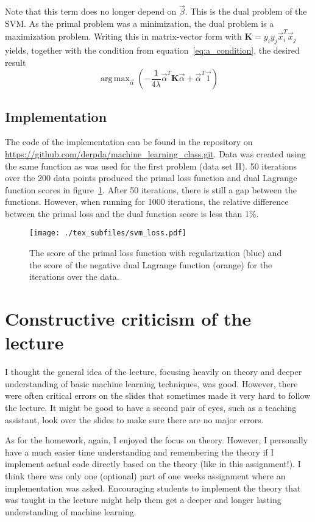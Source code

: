 \documentclass[a4paper]{article}
\DeclareMathOperator*{\argmax}{arg\,max}
\newcommand{\matr}[1]{\mathbf{#1}}
\begin{document}
Note that this term does no longer depend on $\vec{\beta}$. This is the dual
problem of the SVM\@. As the primal problem was a minimization, the dual problem
is a maximization problem. Writing this in matrix-vector form with
$\matr{K}=y_iy_j\vec{x}_i^T\vec{x}_j$ yields, together with the condition from
equation~\ref{eq:a_condition}, the desired result
\begin{equation*}
    \argmax_{\vec{\alpha}}\left(
        - \frac{1}{4\lambda}\vec{\alpha}^T\matr{K}\vec{\alpha}
        + \vec{\alpha}^T\vec{1}
    \right)
\end{equation*}
\subsection{Implementation}
The code of the implementation can be found in the repository on
\url{https://github.com/derpda/machine_learning_class.git}.
Data was created using the same function as was used for the first problem (data
set II). 50 iterations over the 200 data points produced the primal loss
function and dual Lagrange function scores in figure~\ref{fig:svm_loss}.
After 50 iterations, there is still a gap between the functions. However, when
running for 1000 iterations, the relative difference between the primal loss and
the dual function score is less than 1\%.
\begin{figure}[hbt]
    \texttt{[image: ./tex\_subfiles/svm\_loss.pdf]}
    \caption{The score of the primal loss function with regularization (blue)
    and the score of the negative dual Lagrange function (orange) for the
    iterations over the data.}\label{fig:svm_loss}
\end{figure}

\section{Constructive criticism of the lecture}
I thought the general idea of the lecture, focusing heavily on theory and deeper
understanding of basic machine learning techniques, was good. However, there
were often critical errors on the slides that sometimes made it very hard to
follow the lecture. It might be good to have a second pair of eyes, such as a
teaching assistant, look over the slides to make sure there are no major
errors.

As for the homework, again, I enjoyed the focus on theory. However, I personally
have a much easier time understanding and remembering the theory if I implement
actual code directly based on the theory (like in this assignment!). I think
there was only one (optional) part of one weeks assignment where an
implementation was asked. Encouraging students to implement the theory that was
taught in the lecture might help them get a deeper and longer lasting
understanding of machine learning.
\end{document}
